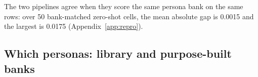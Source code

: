 The two pipelines agree when they score the same persona bank on the same rows: over 50 bank-matched zero-shot cells, the mean absolute gap is 0.0015 and the largest is 0.0175 (Appendix~\ref{app:repro}). %

\subsection{Which personas: library and purpose-built banks}
\label{sec:r-personas}

